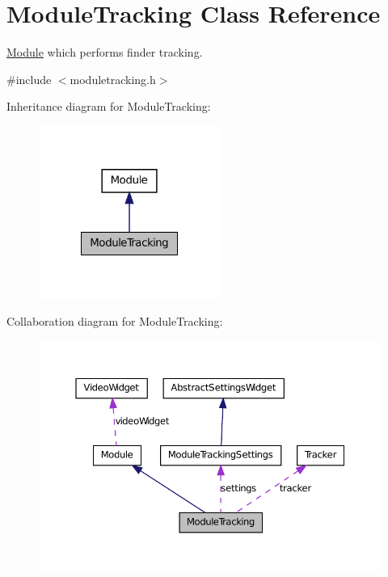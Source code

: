 \hypertarget{class_module_tracking}{
\section{ModuleTracking Class Reference}
\label{da/d70/class_module_tracking}
}


\hyperlink{class_module}{Module} which performs finder tracking.  




{\ttfamily \#include $<$moduletracking.h$>$}



Inheritance diagram for ModuleTracking:\nopagebreak
\begin{figure}[H]
\begin{center}
\leavevmode
\includegraphics[width=168pt]{d3/d1c/class_module_tracking__inherit__graph}
\end{center}
\end{figure}


Collaboration diagram for ModuleTracking:\nopagebreak
\begin{figure}[H]
\begin{center}
\leavevmode
\includegraphics[width=367pt]{d6/d0a/class_module_tracking__coll__graph}
\end{center}
\end{figure}

